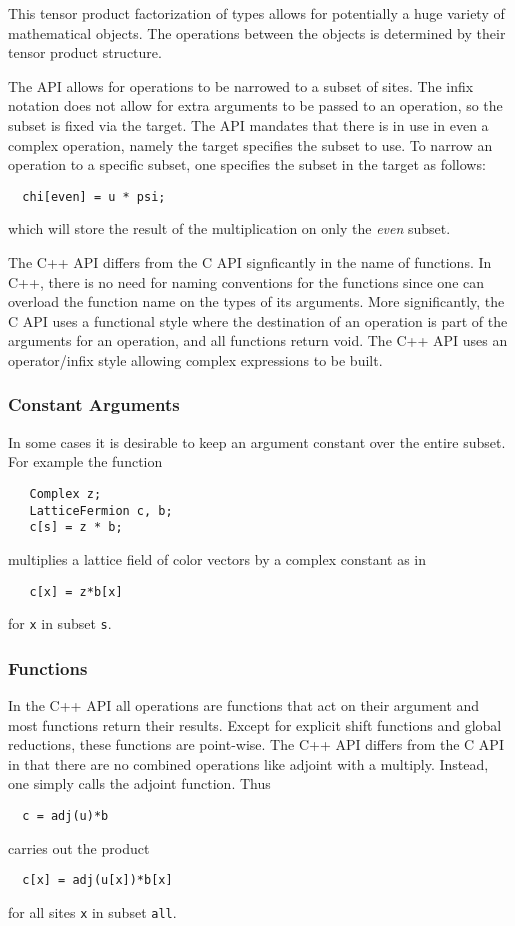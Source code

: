 \documentclass[12pt,letterpaper]{article}
\newcommand{\cpp}{C++}
\begin{document}
This tensor product factorization of types allows for potentially a
huge variety of mathematical objects. The operations between the objects
is determined by their tensor product structure.


The API allows for operations to be narrowed to a subset of sites.
The infix notation does not allow for extra arguments to be passed to
an operation, so the subset is fixed via the target.  
The API mandates that there is in use in even a complex 
operation, namely the target specifies the subset to use. 
To narrow an operation to a specific subset, one
specifies the subset in the target as follows:
%
\begin{verbatim}
  chi[even] = u * psi;
\end{verbatim}
%
which will store the result of the multiplication on only the 
{\em even} subset.

The \cpp{} API differs from the C API signficantly in the name of
functions. In \cpp{}, there is no need for naming conventions for
the functions since one can overload the function name on the types
of its arguments. More significantly, the C API uses a functional
style where the destination of an operation is part of the arguments
for an operation, and all functions return void. The \cpp{} API uses
an operator/infix style allowing complex expressions to be built.


\subsubsection{Constant Arguments}

In some cases it is desirable to keep an argument constant over the
entire subset.  For example the function
%
\begin{verbatim}
   Complex z;
   LatticeFermion c, b;
   c[s] = z * b;
\end{verbatim}
%
multiplies a lattice field of color vectors by a complex constant as in
%
\begin{verbatim}
   c[x] = z*b[x]
\end{verbatim}
%
for {\tt x} in subset {\tt s}.

\subsubsection{Functions}

In the \cpp{} API all operations are functions that act on their
argument and most functions return their results. Except for explicit
shift functions and global reductions, these functions are point-wise.
The \cpp{} API differs from the C API in that there are no combined
operations like adjoint with a multiply.  Instead, one simply calls
the adjoint function.  Thus
%
\begin{verbatim}
  c = adj(u)*b
\end{verbatim}
%
carries out the product
%
\begin{verbatim}
  c[x] = adj(u[x])*b[x]
\end{verbatim}
%
for all sites {\tt x} in subset {\tt all}.
\end{document}
